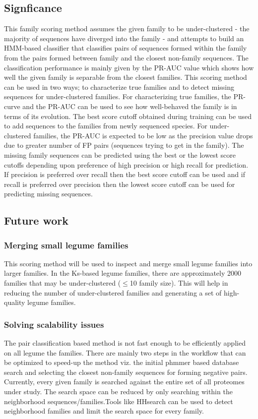 \documentclass{article}
\begin{document}
		\subsection{Signficance}
		This family scoring method assumes the given family to be under-clustered - the majority of sequences have diverged into the family - and attempts to build an HMM-based classifier that classifies pairs of sequences formed within the family from the pairs formed between family and the closest non-family sequences. The classification performance is mainly given by the PR-AUC value which shows how well the given family is separable from the closest families. This scoring method can be used in two ways; to characterize true families and to detect missing sequences for under-clustered families. For characterizing true families, the PR-curve and the PR-AUC can be used to see how well-behaved the family is in terms of its evolution. The best score cutoff obtained during training can be used to add sequences to the families from newly sequenced species. For under-clustered families, the PR-AUC is expected to be low as the precision value drops due to greater number of FP pairs (sequences trying to get in the family). The missing family sequences can be predicted using the best or the lowest score cutoffs depending upon preference of  high precision or high recall for prediction. If precision is preferred over recall then the best score cutoff can be used and if recall is preferred over precision then the lowest score cutoff can be used for predicting missing sequences.
		
		\subsection{Future work}
			\subsubsection{Merging small legume families}
			This scoring method will be used to inspect and merge small legume families into larger families. In the Ks-based legume families, there are approximately 2000 families that may be under-clustered ($\leq$10 family size). This will help in reducing the number of under-clustered families and generating a set of high-quality legume families.
			
			\subsubsection{Solving scalability issues}
			The pair classification based method is not fast enough to be efficiently applied on all legume the families. There are mainly two steps in the workflow that can be optimized to speed-up the method viz. the initial phmmer based database search and selecting the closest non-family sequences for forming negative pairs. Currently, every given family is searched against the entire set of all proteomes under study. The search space can be reduced by only searching within the neighborhood sequences/families.Tools like HHsearch \citep{soding2004protein} can be used to detect neighborhood families and limit the search space for every family. 
			
\end{document}
